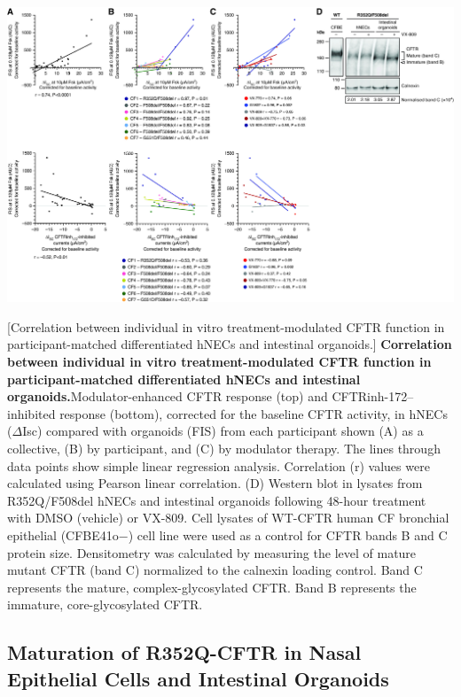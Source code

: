 \begin{center}
	\includegraphics[width=1.00\textwidth]{figures/R352Q/figure_3.jpg}
\end{center}
	\captionsetup{singlelinecheck = false, justification=raggedright}
\begingroup
{}[Correlation between individual in vitro treatment-modulated CFTR function in participant-matched differentiated hNECs and intestinal organoids.] {\textbf{Correlation between individual in vitro treatment-modulated CFTR function in participant-matched differentiated hNECs and intestinal organoids.}}{Modulator-enhanced CFTR response (top) and CFTRinh-172–inhibited response (bottom), corrected for the baseline CFTR activity, in hNECs ($\Delta$Isc) compared with organoids (FIS) from each participant shown (A) as a collective, (B) by participant, and (C) by modulator therapy. The lines through data points show simple linear regression analysis. Correlation (r) values were calculated using Pearson linear correlation. (D) Western blot in lysates from R352Q/F508del hNECs and intestinal organoids following 48-hour treatment with DMSO (vehicle) or VX-809. Cell lysates of WT-CFTR human CF bronchial epithelial (CFBE41o−) cell line were used as a control for CFTR bands B and C protein size. Densitometry was calculated by measuring the level of mature mutant CFTR (band C) normalized to the calnexin loading control. Band C represents the mature, complex-glycosylated CFTR. Band B represents the immature, core-glycosylated CFTR.}
\label{R352Q_figure_3}
\endgroup

\subsection{Maturation of R352Q-CFTR in Nasal Epithelial Cells and Intestinal Organoids}


